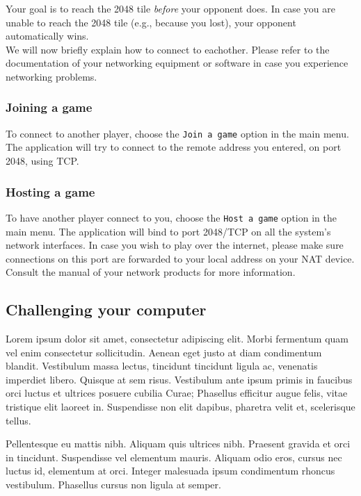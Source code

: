 \documentclass[a4paper,11pt,report]{scrartcl}
\begin{document}
Your goal is to reach the 2048 tile \textit{before} your opponent does. In case you
are unable to reach the 2048 tile (e.g., because you lost), your opponent
automatically wins.\\

We will now briefly explain how to connect to eachother. Please refer to the
documentation of your networking equipment or software in case you experience
networking problems.

\subsubsection{Joining a game}
To connect to another player, choose the \texttt{Join a game} option in the
main menu. The application will try to connect to the remote address you
entered, on port 2048, using TCP.

\subsubsection{Hosting a game}
To have another player connect to you, choose the \texttt{Host a game} option
in the main menu. The application will bind to port 2048/TCP on all the
system's network interfaces. In case you wish to play over the internet,
please make sure connections on this port are forwarded to your local address
on your NAT device. Consult the manual of your network products for more 
information.


\subsection{Challenging your computer}



Lorem ipsum dolor sit amet, consectetur adipiscing elit. Morbi fermentum quam vel enim consectetur sollicitudin. Aenean eget justo at diam condimentum blandit. Vestibulum massa lectus, tincidunt tincidunt ligula ac, venenatis imperdiet libero. Quisque at sem risus. Vestibulum ante ipsum primis in faucibus orci luctus et ultrices posuere cubilia Curae; Phasellus efficitur augue felis, vitae tristique elit laoreet in. Suspendisse non elit dapibus, pharetra velit et, scelerisque tellus.

Pellentesque eu mattis nibh. Aliquam quis ultrices nibh. Praesent gravida et orci in tincidunt. Suspendisse vel elementum mauris. Aliquam odio eros, cursus nec luctus id, elementum at orci. Integer malesuada ipsum condimentum rhoncus vestibulum. Phasellus cursus non ligula at semper.
\end{document}
